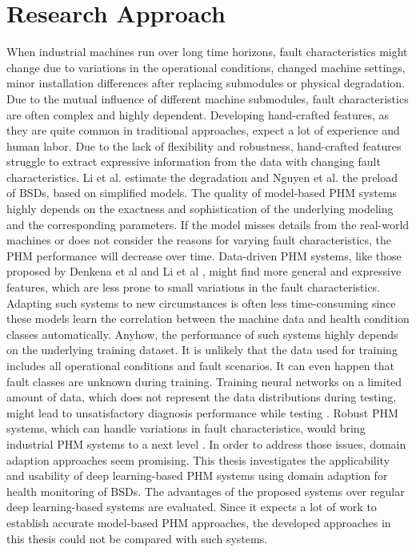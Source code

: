 \chapter{Research Approach}\label{chapter:research_approach}

When industrial machines run over long time horizons, fault characteristics might change due to variations in the operational conditions, changed machine settings, minor installation differences after replacing submodules or physical degradation. Due to the mutual influence of different machine submodules, fault characteristics are often complex and highly dependent. Developing hand-crafted features, as they are quite common in traditional approaches, expect a lot of experience and human labor. Due to the lack of flexibility and robustness, hand-crafted features struggle to extract expressive information from the data with changing fault characteristics. Li et al. \cite{Lee2015} estimate the degradation and Nguyen et al. \cite{NGUYEN2019} the preload of BSDs, based on simplified models. The quality of model-based PHM systems highly depends on the exactness and sophistication of the underlying modeling and the corresponding parameters. If the model misses details from the real-world machines or does not consider the reasons for varying fault characteristics, the PHM performance will decrease over time. Data-driven PHM systems, like those proposed by Denkena et al \cite{Denkena2021} and Li et al \cite{LiPin2018}, might find more general and expressive features, which are less prone to small variations in the fault characteristics. Adapting such systems to new circumstances is often less time-consuming since these models learn the correlation between the machine data and health condition classes automatically. Anyhow, the performance of such systems highly depends on the underlying training dataset. It is unlikely that the data used for training includes all operational conditions and fault scenarios. It can even happen that fault classes are unknown during training. Training neural networks on a limited amount of data, which does not represent the data distributions during testing, might lead to unsatisfactory diagnosis performance while testing \cite{AZAMFAR2020103932}. Robust PHM systems, which can handle variations in fault characteristics, would bring industrial PHM systems to a next level \cite{Michau2017}. In order to address those issues, domain adaption approaches seem promising. This thesis investigates the applicability and usability of deep learning-based PHM systems using domain adaption for health monitoring of BSDs. The advantages of the proposed systems over regular deep learning-based systems are evaluated. Since it expects a lot of work to establish accurate model-based PHM approaches, the developed approaches in this thesis could not be compared with such systems.

